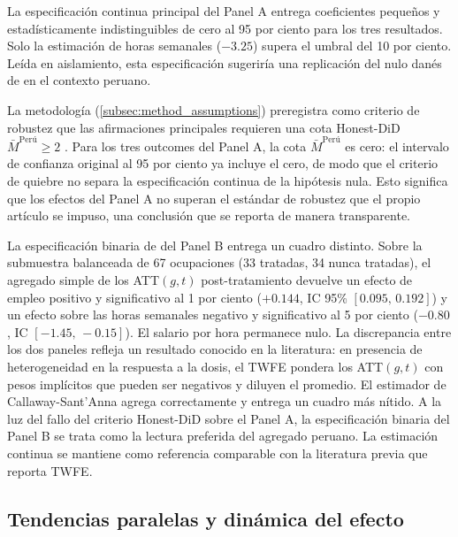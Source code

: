 La especificaci\'{o}n continua principal del Panel A entrega coeficientes peque\~{n}os y estad\'{i}sticamente indistinguibles de cero al 95 por ciento para los tres resultados. Solo la estimaci\'{o}n de horas semanales ($-3.25$) supera el umbral del 10 por ciento. Le\'{i}da en aislamiento, esta especificaci\'{o}n sugerir\'{i}a una replicaci\'{o}n del nulo dan\'{e}s de \citet{HumlumVestergaard2025_llm} en el contexto peruano.

La metodolog\'{i}a (\cref{subsec:method_assumptions}) preregistra como criterio de robustez que las afirmaciones principales requieren una cota Honest-DiD $\bar M^{\text{Per\'{u}}} \geq 2$ \citep{RambachanRoth2023_honest}. Para los tres outcomes del Panel A, la cota $\bar M^{\text{Per\'{u}}}$ es cero: el intervalo de confianza original al 95 por ciento ya incluye el cero, de modo que el criterio de quiebre no separa la especificaci\'{o}n continua de la hip\'{o}tesis nula. Esto significa que los efectos del Panel A no superan el est\'{a}ndar de robustez que el propio art\'{i}culo se impuso, una conclusi\'{o}n que se reporta de manera transparente.

La especificaci\'{o}n binaria de \citet{CallawayS2021_did} del Panel B entrega un cuadro distinto. Sobre la submuestra balanceada de 67 ocupaciones (33 tratadas, 34 nunca tratadas), el agregado simple de los ATT$(g,t)$ post-tratamiento devuelve un efecto de empleo positivo y significativo al 1 por ciento ($+0.144$, IC 95\% $[0.095,\,0.192]$) y un efecto sobre las horas semanales negativo y significativo al 5 por ciento ($-0.80$, IC $[-1.45,\,-0.15]$). El salario por hora permanece nulo. La discrepancia entre los dos paneles refleja un resultado conocido en la literatura: en presencia de heterogeneidad en la respuesta a la dosis, el TWFE pondera los ATT$(g,t)$ con pesos impl\'{i}citos que pueden ser negativos y diluyen el promedio. El estimador de Callaway-Sant'Anna agrega correctamente y entrega un cuadro m\'{a}s n\'{i}tido. A la luz del fallo del criterio Honest-DiD sobre el Panel A, la especificaci\'{o}n binaria del Panel B se trata como la lectura preferida del agregado peruano. La estimaci\'{o}n continua se mantiene como referencia comparable con la literatura previa que reporta TWFE.

\subsection{Tendencias paralelas y din\'{a}mica del efecto}
\label{subsec:results_event_study}

